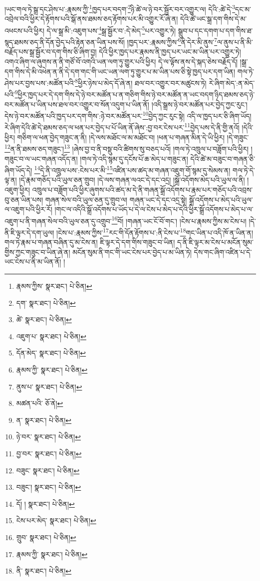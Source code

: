 །ཡང་གལ་ཏེ་སྒྲ་དང་ཤེས་པ་:རྣམས་ཀྱི་\footnote{རྣམས་ཀྱིས་  སྣར་ཐང་།  པེ་ཅིན། }ཁྱད་པར་བདག་\footnote{དག་  སྣར་ཐང་།  པེ་ཅིན། }ཉི་ཚེ་ལ་ཉེ་བར་སྦྱོར་བར་འགྱུར་ལ། དེའི་:ཚེ་དེ་\footnote{ཚེ་  སྣར་ཐང་།  པེ་ཅིན། }དང་མ་འབྲེལ་བའི་ཕྱིར་དེ་རྟོགས་པའི་སྒོ་ནས་ཐམས་ཅད་རྟོགས་པར་མི་འགྱུར་རོ་ཞེ་ན། དེའི་ཚེ་ཡང་སྒྲ་དག་གིས་དེ་མ་འཕངས་པའི་ཕྱིར། དེ་ལ་སྒྲ་མི་:འཇུག་པས་\footnote{འཇུག་པ་  སྣར་ཐང་།  པེ་ཅིན། }སྒྲ་སྦྱོར་བ་:དེ་མེད་\footnote{དོན་མེད་  སྣར་ཐང་།  པེ་ཅིན། }པར་འགྱུར་ཏེ། སྒྲུབ་པ་དང་དགག་པ་དག་གིས་ཐ་སྙད་ཐམས་ཅད་ནི་དོན་བྱེད་པའི་རྟེན་ཅན་ཡིན་པས་སོ། །ཁྱད་པར་:རྣམས་ཀྱིས་\footnote{རྣམས་ཀྱི་  སྣར་ཐང་།  པེ་ཅིན། }ནི་དེར་མི་ནུས་\footnote{ནུས་པ་  སྣར་ཐང་།  པེ་ཅིན། }ལ་ནུས་པ་ནི་མི་བརྗོད་པས་སྒྲ་སྦྱོར་བ་དག་གིས་ཅི་ཞིག་བྱ། དེའི་ཕྱིར་ཁྱད་པར་རྣམས་ནི་ཁྱད་པར་ཡང་མ་ཡིན་པར་འགྱུར་ཏེ། འགའ་ཞིག་ལ་ཞུགས་ན་ནི་གཙོ་བོ་འགའི་ཡན་ལག་ཏུ་གྱུར་པའི་ཕྱིར། དེ་ལ་ལྟོས་ནས་དེ་སྐད་ཅེས་བརྗོད་དོ། །སྒྲ་དག་གིས་དེ་མི་འཕེན་ན་ནི་དེ་དག་གང་གི་ཡང་ཡན་ལག་ཏུ་གྱུར་པ་མ་ཡིན་པས་ཅི་སྟེ་ཁྱད་པར་དག་ཡིན། གལ་ཏེ་ཤེས་པར་བྱས་པས་:མཚོན་པའི་\footnote{མཚན་པའི་  ཅོ་ནེ། }ཕྱིར་ཉེས་པ་མེད་དོ་ཞེ་ན། ཐལ་བར་འགྱུར་བར་མཚུངས་ཏེ། རེ་ཞིག་མེད་:ན་མེད་པའི་\footnote{ན་  སྣར་ཐང་།  པེ་ཅིན། }ཕྱིར་ཁྱད་པར་དེ་དག་གིས་དེ་ཉེ་བར་མཚོན་པ་ན་གཅིག་གིས་ཉེ་བར་མཚོན་ན་ཡང་བདག་ཉིད་ཐམས་ཅད་ཉེ་བར་མཚོན་པ་ཡིན་པས་ཐལ་བར་འགྱུར་བ་སོན་འདུག་པ་ཡིན་ནོ། །འདི་སྒྲས་ཉེ་བར་མཚོན་པར་བྱེད་ཀྱང་རུང་། དེས་ཉེ་བར་མཚོན་པའི་ཁྱད་པར་དག་གིས་:ཉེ་བར་མཚོན་པར་\footnote{ཉེ་བར་  སྣར་ཐང་།  པེ་ཅིན། }བྱེད་ཀྱང་རུང་སྟེ། འདི་ལ་ཁྱད་པར་ཅི་ཞིག་ཡོད། རེ་ཞིག་དེའི་ཚེ་དེ་ཐམས་ཅད་ལ་ཕན་པར་བྱེད་པ་པོ་ཡིན་ནོ་ཞེས་:བྱ་བར་ངེས་པར་\footnote{བྱ་བར་  སྣར་ཐང་།  པེ་ཅིན། }བྱེད་པས་དེ་ནི་གྱི་ནའོ། །དེའི་ཕྱིར། གཅིག་ལ་ཕན་བྱེད་གཟུང་ན་ནི། །དེ་ལས་མཐོང་ལ་མ་མཐོང་བ། །ཕན་པ་གཞན་མིན་དེ་ཡི་ཕྱིར། །དེ་གཟུང་\footnote{བཟུང་  སྣར་ཐང་།  པེ་ཅིན། }ན་ནི་ཐམས་ཅད་གཟུང་།\footnote{བཟུང་།  སྣར་ཐང་།  པེ་ཅིན། } །ཞེས་བྱ་བ་ནི་བསྡུ་བའི་ཚིགས་སུ་བཅད་པའོ། །གལ་ཏེ་འཁྲུལ་པ་བཟློག་པའི་ཕྱིར། །གཟུང་བ་ལ་ཡང་གཞན་འདོད་ན། །གལ་ཏེ་འདི་སྙམ་དུ་དངོས་པོ་ཆ་མེད་པ་གཟུང་ན། དེའི་ཚེ་མ་བཟུང་བ་གཞན་ཅི་ཞིག་ཡོད་དེ། \footnote{དོ། །   སྣར་ཐང་།  པེ་ཅིན། }དེ་ནི་འཁྲུལ་པས་:ངེས་པར་མི་\footnote{ངེས་པར་མེད་  སྣར་ཐང་།  པེ་ཅིན། }འཛིན་པས་ཚད་མ་གཞན་འཇུག་གོ་སྙམ་དུ་སེམས་ན། གལ་ཏེ་དེ་ལྟ་ན། །དེ་རྣམ་གཅོད་པའི་ཡུལ་ཅན་གྲུབ། །དེ་ལས་གཞན་ལའང་དེ་དང་འདྲ། །སྒྲོ་འདོགས་མེད་པའི་ཡུལ་ལ་ནི། །འཇུག་ཕྱིར། འཁྲུལ་པ་བཟློག་པའི་ཕྱིར་ཞུགས་པའི་ཚད་མ་དེ་ནི་གཞན་སྒྲོ་འདོགས་པ་རྣམ་པར་གཅོད་པའི་འབྲས་བུ་ཅན་ཡིན་པས། གཞན་སེལ་བའི་ཡུལ་ཅན་དུ་གྲུབ་ལ། གཞན་ཡང་དེ་དང་འདྲ་སྟེ། སྒྲོ་འདོགས་པ་མེད་པའི་ཡུལ་ལ་འཇུག་པའི་ཕྱིར་རོ། །གང་ལ་འདིའི་སྒྲོ་འདོགས་པ་ཡོད་པ་དེ་ལ་ངེས་པ་མེད་པ་དེའི་ཕྱིར་སྒྲོ་འདོགས་པ་མེད་པ་ལ་འཇུག་པ་ནི་གཞན་སེལ་བའི་ཡུལ་ཅན་དུ་འགྲུབ་\footnote{གྲུབ་  སྣར་ཐང་།  པེ་ཅིན། }བོ། །གཞན་ཡང་ངོ་བོ་གང་། །ངེས་པ་རྣམས་ཀྱིས་མ་ངེས་པ། །དེ་ནི་ཇི་ལྟར་དེ་དག་ཡུལ། །ངེས་པ་:རྣམས་ཀྱིས་\footnote{རྣམས་ཀྱི་  སྣར་ཐང་།  པེ་ཅིན། }རང་གི་དོན་རྟོགས་པ་:ནི་ངེས་པ་\footnote{ནི་  སྣར་ཐང་།  པེ་ཅིན། }གང་ཡིན་པ་འདི་ཁོ་ན་ཡིན་ན། གལ་ཏེ་རྣམ་པ་གཞན་བཞིན་དུ་མ་ངེས་ན། ཇི་ལྟར་དེ་དག་གིས་གཟུང་བ་ཡིན། ད་ནི་ཇི་ལྟར་མ་ངེས་པ་མངོན་སུམ་གྱིས་ཀྱང་གཟུང་བ་ཡིན་ཞེ་ན། མངོན་སུམ་ནི་གང་གི་ཡང་ངེས་པར་བྱེད་པ་མ་ཡིན་ཏེ། དེས་གང་ཞིག་འཛིན་པ་དེ་ཡང་ངེས་པ་ནི་མ་ཡིན་ནོ། །
